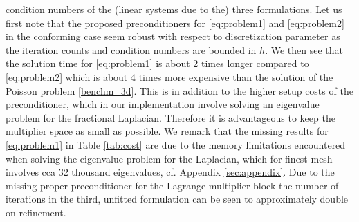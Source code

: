 \documentclass[r]{siamart171218}
\begin{document}
condition numbers of the (linear systems due to the) three formulations.
Let us first note that the proposed preconditioners for \eqref{eq:problem1} and
\eqref{eq:problem2} in the conforming case seem robust with respect to discretization
parameter as the iteration counts and condition numbers are bounded in $h$.
We then see that the solution time for \eqref{eq:problem1} is about 2 times
longer compared to \eqref{eq:problem2} which is about 4 times more expensive
than the solution of the Poisson problem \eqref{benchm_3d}. This is in addition to the
higher setup costs of the preconditioner, which in our implementation involve solving
an eigenvalue problem for the fractional Laplacian. Therefore it is advantageous to keep
the multiplier space as small as possible. We remark that the missing
results for \eqref{eq:problem1} in Table \ref{tab:cost} are due to the
memory limitations encountered when solving the eigenvalue problem
for the Laplacian, which for finest mesh involves cca 32 thousand eigenvalues, cf. Appendix \ref{sec:appendix}.
%
Due to the missing proper preconditioner for the Lagrange multiplier block the
number of iterations in the third, unfitted formulation can be seen to approximately
double on refinement. 
\end{document}
